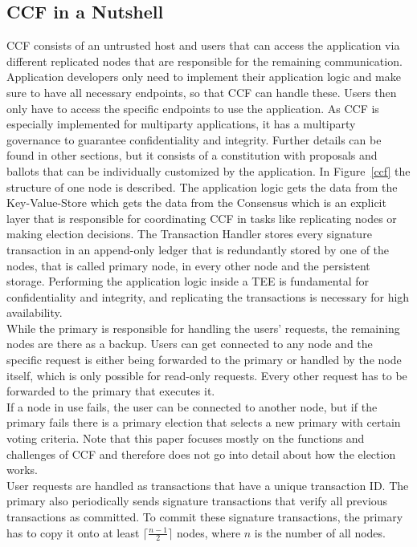 \subsection{CCF in a Nutshell}
CCF consists of an untrusted host and users that can access the application via different replicated nodes that are responsible for the remaining communication. Application developers only need to implement their application logic and make sure to have all necessary endpoints, so that CCF can handle these. Users then only have to access the specific endpoints to use the application. As CCF is especially implemented for multiparty applications, it has a multiparty governance to guarantee confidentiality and integrity. Further details can be found in other sections, but it consists of a constitution with proposals and ballots that can be individually customized by the application. In Figure~\ref{ccf} the structure of one node is described. The application logic gets the data from the Key-Value-Store which gets the data from the Consensus which is an explicit layer that is responsible for coordinating CCF in tasks like replicating nodes or making election decisions.
  The Transaction Handler stores every signature transaction in an append-only ledger that is redundantly stored by one of the nodes, that is called primary node, in every other node and the persistent storage. Performing the application logic inside a TEE is fundamental for confidentiality and integrity, and replicating the transactions is necessary for high availability.\\ %
While the primary is responsible for handling the users' requests, the remaining nodes are there as a backup. Users can get connected to any node and the specific request is either being forwarded to the primary or handled by the node itself, which is only possible for read-only requests. Every other request has to be forwarded to the primary that executes it.\\
 If a node in use fails, the user can be connected to another node, but if the primary fails there is a primary election that selects a new primary with certain voting criteria. Note that this paper focuses mostly on the functions and challenges of CCF and therefore does not go into detail about how the election works. \\
 User requests are handled as transactions that have a unique transaction ID. The primary also periodically sends signature transactions that verify all previous transactions as committed. To commit these signature transactions, the primary has to copy it onto at least $\lceil\frac{n-1}{2}\rceil$ nodes, where $n$ is the number of all nodes.\\
